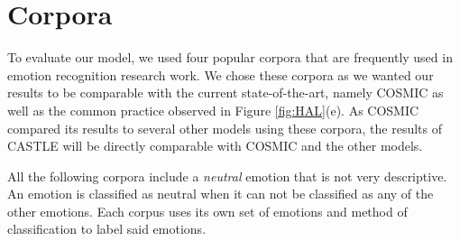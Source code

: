 \documentclass[nofilelist]{cslthse-msc}
\begin{document}


\section{Corpora}

To evaluate our model, we used four popular corpora that are frequently used in emotion recognition research work. We chose these corpora as we wanted our results to be comparable with the current state-of-the-art, namely COSMIC as well as the common practice observed in Figure \ref{fig:HAL}(e). As COSMIC compared its results to several other models using these corpora, the results of CASTLE will be directly comparable with COSMIC and the other models. 

All the following corpora include a \textit{neutral} emotion that is not very descriptive. An emotion is classified as neutral when it can not be classified as any of the other emotions. Each corpus uses its own set of emotions and method of classification to label said emotions. 


\end{document}

